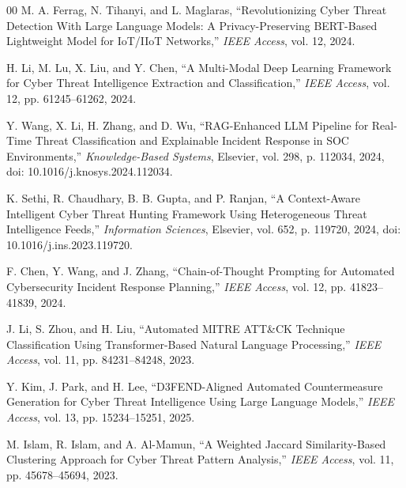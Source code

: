 \documentclass[conference]{IEEEtran}
\begin{document}
\begin{thebibliography}{00}
M. A. Ferrag, N. Tihanyi, and L. Maglaras,
``Revolutionizing Cyber Threat Detection With Large Language Models: A
Privacy-Preserving BERT-Based Lightweight Model for IoT/IIoT Networks,''
\textit{IEEE Access}, vol. 12, 2024.

H. Li, M. Lu, X. Liu, and Y. Chen,
``A Multi-Modal Deep Learning Framework for Cyber Threat Intelligence
Extraction and Classification,''
\textit{IEEE Access}, vol. 12, pp. 61245--61262, 2024.

Y. Wang, X. Li, H. Zhang, and D. Wu,
``RAG-Enhanced LLM Pipeline for Real-Time Threat Classification and
Explainable Incident Response in SOC Environments,''
\textit{Knowledge-Based Systems}, Elsevier, vol. 298, p. 112034, 2024,
doi: 10.1016/j.knosys.2024.112034.

K. Sethi, R. Chaudhary, B. B. Gupta, and P. Ranjan,
``A Context-Aware Intelligent Cyber Threat Hunting Framework Using
Heterogeneous Threat Intelligence Feeds,''
\textit{Information Sciences}, Elsevier, vol. 652, p. 119720, 2024,
doi: 10.1016/j.ins.2023.119720.

F. Chen, Y. Wang, and J. Zhang,
``Chain-of-Thought Prompting for Automated Cybersecurity Incident Response
Planning,''
\textit{IEEE Access}, vol. 12, pp. 41823--41839, 2024.

J. Li, S. Zhou, and H. Liu,
``Automated MITRE ATT\&CK Technique Classification Using Transformer-Based
Natural Language Processing,''
\textit{IEEE Access}, vol. 11, pp. 84231--84248, 2023.

Y. Kim, J. Park, and H. Lee,
``D3FEND-Aligned Automated Countermeasure Generation for Cyber Threat
Intelligence Using Large Language Models,''
\textit{IEEE Access}, vol. 13, pp. 15234--15251, 2025.

M. Islam, R. Islam, and A. Al-Mamun,
``A Weighted Jaccard Similarity-Based Clustering Approach for Cyber Threat
Pattern Analysis,''
\textit{IEEE Access}, vol. 11, pp. 45678--45694, 2023.

\end{thebibliography}
\end{document}

